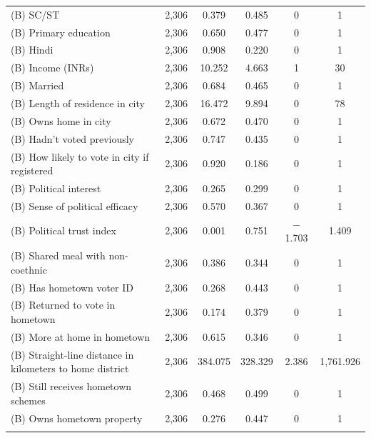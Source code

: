\documentclass[
  11.5pt,
]{article}
\begin{document}
\begin{table}[!htbp]
\begin{tabular}{@{\extracolsep{5pt}}lccccc}
(B) SC/ST & 2,306 & 0.379 & 0.485 & 0 & 1 \\ 
(B) Primary education & 2,306 & 0.650 & 0.477 & 0 & 1 \\ 
(B) Hindi & 2,306 & 0.908 & 0.220 & 0 & 1 \\ 
(B) Income (INRs) & 2,306 & 10.252 & 4.663 & 1 & 30 \\ 
(B) Married & 2,306 & 0.684 & 0.465 & 0 & 1 \\ 
(B) Length of residence in city & 2,306 & 16.472 & 9.894 & 0 & 78 \\ 
(B) Owns home in city & 2,306 & 0.672 & 0.470 & 0 & 1 \\ 
(B) Hadn't voted previously & 2,306 & 0.747 & 0.435 & 0 & 1 \\ 
(B) How likely to vote in city if registered & 2,306 & 0.920 & 0.186 & 0 & 1 \\ 
(B) Political interest & 2,306 & 0.265 & 0.299 & 0 & 1 \\ 
(B) Sense of political efficacy & 2,306 & 0.570 & 0.367 & 0 & 1 \\ 
(B) Political trust index & 2,306 & 0.001 & 0.751 & $-$1.703 & 1.409 \\ 
(B) Shared meal with non-coethnic & 2,306 & 0.386 & 0.344 & 0 & 1 \\ 
(B) Has hometown voter ID & 2,306 & 0.268 & 0.443 & 0 & 1 \\ 
(B) Returned to vote in hometown & 2,306 & 0.174 & 0.379 & 0 & 1 \\ 
(B) More at home in hometown & 2,306 & 0.615 & 0.346 & 0 & 1 \\ 
(B) Straight-line distance in kilometers to home district & 2,306 & 384.075 & 328.329 & 2.386 & 1,761.926 \\ 
(B) Still receives hometown schemes & 2,306 & 0.468 & 0.499 & 0 & 1 \\ 
(B) Owns hometown property & 2,306 & 0.276 & 0.447 & 0 & 1 \\ 
\hline \\[-1.8ex] 
\end{tabular} 
\end{table}

\clearpage
\end{document}
